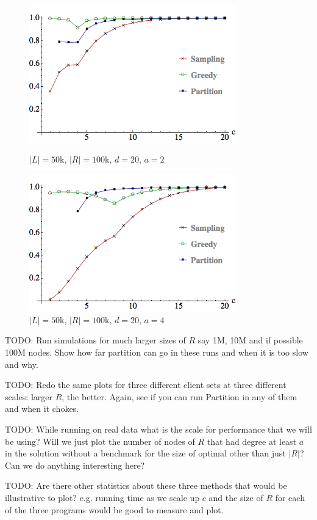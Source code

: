 \begin{figure}[t]
\centering
\begin{minipage}[h]{0.48\textwidth}
\centering
\includegraphics[width=0.8\textwidth]{images/l=50000,r=100000,a=2_Greedy_vs_Naive.png}
\caption{$|L|=50$k, $|R|=100$k, $d=20$, $a=2$}\label{fig:a=2}
\end{minipage}
\hspace{0cm}
\begin{minipage}[h]{0.48\textwidth}
\centering
\includegraphics[width=0.8\textwidth]{images/l=50000,r=100000,a=4_Greedy_vs_Naive.png}
\caption{$|L|=50$k, $|R|=100$k, $d=20$, $a=4$}\label{fig:a=4}
\end{minipage}
\vspace{-0.2in}
\end{figure}


TODO: Run simulations for much larger sizes of $R$ say 1M, 10M and if possible 100M nodes. Show how far partition can go in these runs and when it is too slow and why.

TODO: Redo the same plots for three different client sets at three different scales: larger $R$, the better. Again, see if you can run Partition in any of them and when it chokes. 

TODO: While running on real data what is the scale for performance that we will be using? Will we just plot the number of nodes of $R$ that had degree at least $a$ in the solution without a benchmark for the size of optimal other than just $|R|$? Can we do anything interesting here?

TODO: Are there other statistics about these three methods that would be illustrative to plot? e.g. running time as we scale up $c$ and the size of $R$ for each of the three programs would be good to measure and plot.

 